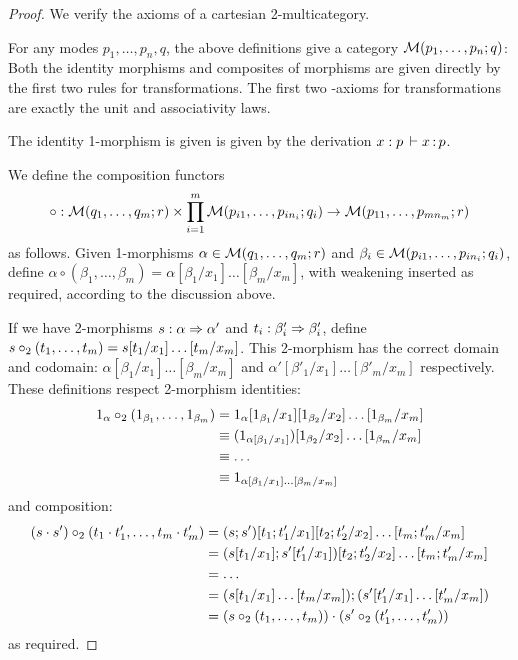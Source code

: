 \begin{proof}
We verify the axioms of a cartesian 2-multicategory.

For any modes $p_1, \dots, p_n, q$, the above definitions give a category $\mathcal{M}(p_1,\ldots,p_n;q)$: Both the identity morphisms and composites of morphisms are given directly by the first two rules for transformations. The first two \deq-axioms for transformations are exactly the unit and associativity laws.

The identity 1-morphism is given is given by the derivation $x : p \, \vdash x \, \mathit{:} \, p$.

We define the composition functors
\[ \circ : \mathcal{M}(q_1, \dots, q_m; r) \times \prod_{i=1}^m \mathcal{M}(p_{i1},\dots,p_{in_i};q_i) \rightarrow \mathcal{M}(p_{11},\dots,p_{mn_m};r) \]
as follows. Given 1-morphisms $\alpha \in \mathcal{M}(q_1, \dots, q_m; r)$ and $\beta_i \in \mathcal{M}(p_{i1},\dots,p_{in_i};q_i)$, define $\alpha \circ (\beta_1, \dots, \beta_m) = \alpha[\beta_1/x_1] \dots [\beta_m / x_m]$, with weakening inserted as required, according to the discussion above.

 If we have 2-morphisms $s : \alpha \Rightarrow \alpha'$ and $t_i : \beta_i' \Rightarrow \beta_i'$, define $s \mathbin{\circ_2} (t_1, \dots, t_m) = s[t_1/x_1]\dots[t_m/x_m]$. This 2-morphism has the correct domain and codomain: $\alpha[\beta_1/x_1] \dots [\beta_m / x_m]$ and $\alpha'[\beta'_1/x_1] \dots [\beta'_m / x_m]$ respectively. These definitions respect 2-morphism identities:
\begin{align*}
1_\alpha \mathbin{\circ_2} (1_{\beta_1}, \dots, 1_{\beta_m}) 
&= 1_\alpha[1_{\beta_1}/x_1][1_{\beta_2}/x_2]\dots[1_{\beta_m}/x_m] \\
&\equiv (1_{\alpha[\beta_1/x_1]})[1_{\beta_2}/x_2]\dots[1_{\beta_m}/x_m] \\
&\equiv \dots \\
&\equiv 1_{\alpha[\beta_1/x_1] \dots [\beta_m / x_m]}
\end{align*}
and composition:
\begin{align*}
(s \cdot s') \mathbin{\circ_2} (t_1 \cdot t_1', \dots, t_m \cdot t_m')
&= (s;s')[t_1;t_1'/x_1][t_2;t_2'/x_2]\dots[t_m;t_m'/x_m] \\ 
&= (s[t_1/x_1];s'[t_1'/x_1])[t_2;t_2'/x_2]\dots[t_m;t_m'/x_m] \\
&= \dots \\
&= (s[t_1/x_1]\dots[t_m/x_m]);(s'[t'_1/x_1]\dots[t'_m/x_m]) \\
&= (s \mathbin{\circ_2} (t_1, \dots, t_m)) \cdot (s' \mathbin{\circ_2} (t'_1, \dots, t'_m))
\end{align*}
as required.


\end{proof}
